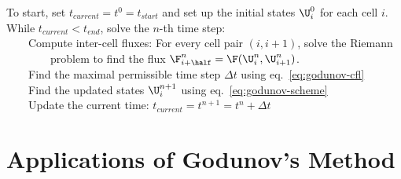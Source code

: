 {
To start, set $t_{current} = t^0 = t_{start}$ and set up the initial states $\U_i^0$ for
each cell $i$.\\[.5em]
%
While $t_{current} < t_{end}$, solve the $n$-th time step:\\[.5em]
%
\indent~~~~Compute inter-cell fluxes: For every cell pair $(i, i+1)$, solve the Riemann \\
%
\indent~~~~~~~~problem to find the flux
$\F^n_{i+\half} = \F(\U_i^n, \U_{i+1}^n)$. \\[.5em]
%
\indent~~~~Find the maximal permissible time step $\Delta t$ using eq.~\ref{eq:godunov-cfl} \\[.5em]
%
\indent~~~~Find the updated states $\U_i^{n+1}$ using eq.~\ref{eq:godunov-scheme} \\[.5em]
%
\indent~~~~Update the current time: $t_{current} = t^{n+1} = t^n + \Delta t$
}













\section{Applications of Godunov's Method}\label{chap:godunov-application}

